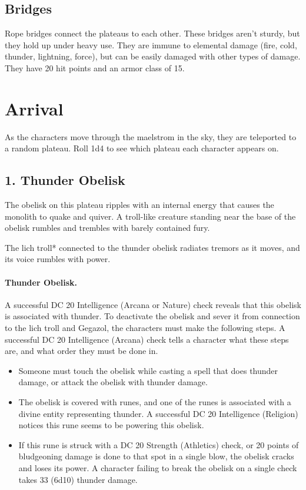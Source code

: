 \documentclass[10pt,a4paper,twoside,twocolumn,openany,bg=print,nodeprecatedcode]{dndbook}
\begin{document}
\subsection{Bridges}
Rope bridges connect the plateaus to each other. These bridges aren't sturdy, but they hold up under heavy use. They are immune to elemental damage (fire, cold, thunder, lightning, force), but can be easily damaged with other types of damage. They have 20 hit points and an armor class of 15.
\section{Arrival}
As the characters move through the maelstrom in the sky, they are teleported to a random plateau. Roll 1d4 to see which plateau each character appears on.
\subsection{1. Thunder Obelisk}
\begin{DndReadAloud}{}
The obelisk on this plateau ripples with an internal energy that causes the monolith to quake and quiver. A troll-like creature standing near the base of the obelisk rumbles and trembles with barely contained fury.
\end{DndReadAloud}

The lich troll* connected to the thunder obelisk radiates tremors as it moves, and its voice rumbles with power.
\paragraph{Thunder Obelisk.}
A successful DC 20 Intelligence (Arcana or Nature) check reveals that this obelisk is associated with thunder. To deactivate the obelisk and sever it from connection to the lich troll and Gegazol, the characters must make the following steps. A successful DC 20 Intelligence (Arcana) check tells a character what these steps are, and what order they must be done in.

\begin{itemize}
\item Someone must touch the obelisk while casting a spell that does thunder damage, or attack the obelisk with thunder damage.
\item The obelisk is covered with runes, and one of the runes is associated with a divine entity representing thunder. A successful DC 20 Intelligence (Religion) notices this rune seems to be powering this obelisk.
\item If this rune is struck with a DC 20 Strength (Athletics) check, or 20 points of bludgeoning damage is done to that spot in a single blow, the obelisk cracks and loses its power. A character failing to break the obelisk on a single check takes 33 (6d10) thunder damage.
\end{itemize}
\end{document}
